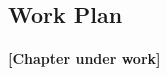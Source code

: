 \begin{landscape}

\chapter{Work Plan} %

\label{Chapter:WorkPlan}

\subsubsection*{\color{mygray}[Chapter under work]}

\begin{gantt}{7}{12}
\begin{ganttitle}
\end{ganttitle}

\begin{ganttitle}
\end{ganttitle}


\end{gantt}

\end{landscape}






